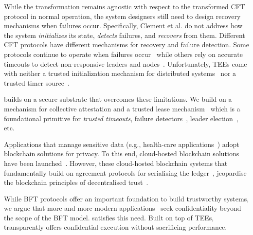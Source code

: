  While the transformation remains agnostic with respect to the transformed CFT protocol in normal operation, the system designers still need to design recovery mechanisms when failures occur. Specifically, Clement et al. do not address how the system \emph{initializes} its state, \emph{detects} failures, and \emph{recovers} from them.  Different CFT protocols have different mechanisms for recovery and failure detection. Some protocols continue to operate when failures occur~\cite{lynch:1997, primary-backup} while others rely on accurate timeouts to detect non-responsive leaders and nodes~\cite{Hermes:2020, raft, chain-replication}. Unfortunately, TEEs come with neither a trusted initialization mechanism for distributed systems~\cite{ias} nor a trusted timer source~\cite{sgxtrustedtime, monotoniccounterssgx}.

\projecttitle{} builds on a secure substrate that overcomes these limitations. We build on a mechanism for collective attestation and a trusted lease mechanism~\cite{t-lease} which is a foundational primitive for \emph{trusted timeouts}, failure detectors~\cite{222603}, leader election~\cite{815321}, etc.
 


 Applications that manage sensitive data (e.g., health-care applications~\cite{10.1093/jamia/ocx068}) adopt blockchain solutions for privacy. To this end, cloud-hosted blockchain solutions have been launched~\cite{baasAlibaba, baasAWS, baasAzure, baasIBM, baasOracle}. However, these cloud-hosted blockchain systems that fundamentally build on agreement protocols for serialising the ledger~\cite{rafthyperledger}, jeopardise the blockchain principles of decentralised trust~\cite{10.1145/3528535.3531516}. %

While BFT protocols offer an important foundation to build trustworthy systems, we argue that more and more modern applications~\cite{9484786, 6038579, Chong2007SIFEC, privacy_nlm, cryptdb, trustedDB, ciad} seek confidentiality beyond the scope of the BFT model. \projecttitle{} satisfies this need. Built on top of TEEs, \projecttitle{} transparently offers confidential execution without sacrificing performance.